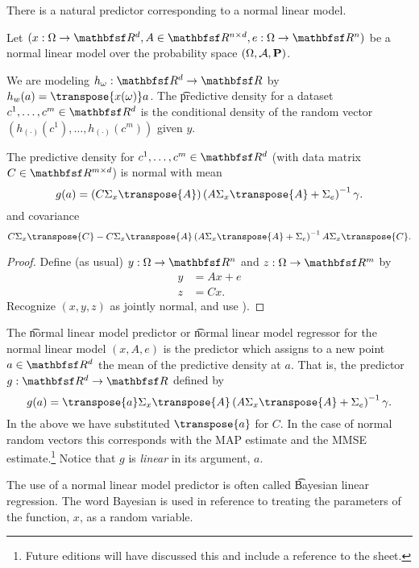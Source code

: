 

There is a natural predictor corresponding to a normal linear model.


Let $(x: \Omega \to \R^d, A \in \R^{n \times d}, e: \Omega \to \R^n)$ be a normal linear model over the probability space $(\Omega, \mathcal{A}, \mathbf{P})$.


We are modeling $h_\omega: \R^d \to \R$ by $h_w(a) = \transpose{x(\omega)}a$.
The \t{predictive density} for a dataset $c^1, \dots, c^m \in \R^d$ is the conditional density of the random vector $(h_{(\cdot)}(c^1), \dots, h_{(\cdot)}(c^m))$ given $y$.


\begin{proposition}
  The predictive density for $c^1, \dots, c^m \in \R^d$ (with data matrix $C \in \R^{m \times d}$) is normal with mean
  \[
    g(a) = (C\Sigma_{x}\transpose{A})\invp{A\Sigma_{x}\transpose{A} + \Sigma_e}\gamma.
  \]
  and covariance
  \[
    C\Sigma_{x}\transpose{C} - C\Sigma_{x}\transpose{A}\invp{A\Sigma_{x}\transpose{A} + \Sigma_e}A\Sigma_{x}\transpose{C}.
  \]
  \begin{proof}
    Define (as usual) $y: \Omega \to \R^n$ and $z : \Omega \to \R^m$ by
  \[
  \begin{aligned}
    y &= Ax + e \\
    z &= Cx.
  \end{aligned}
  \]
    Recognize $(x, y, z)$ as jointly normal, and use ).
  \end{proof}
\end{proposition}


The \t{normal linear model predictor} or \t{normal linear model regressor} for the normal linear model $(x, A, e)$ is the predictor which assigns to a new point $a \in \R^d$ the mean of the predictive density at $a$.
That is, the predictor $g: \R^d \to \R$ defined by
\[
  g(a) = \transpose{a}\Sigma_{x}\transpose{A}\invp{A\Sigma_{x}\transpose{A} + \Sigma_e}\gamma.
\]
In the above we have substituted $\transpose{a}$ for $C$.
In the case of normal random vectors this corresponds with the MAP estimate and the MMSE estimate.\footnote{Future editions will have discussed this and include a reference to the sheet.}
Notice that $g$ is \textit{linear} in its argument, $a$.

The use of a normal linear model predictor is often called \t{Bayesian linear regression}.
The word Bayesian is used in reference to treating the parameters of the function, $x$, as a random variable.

